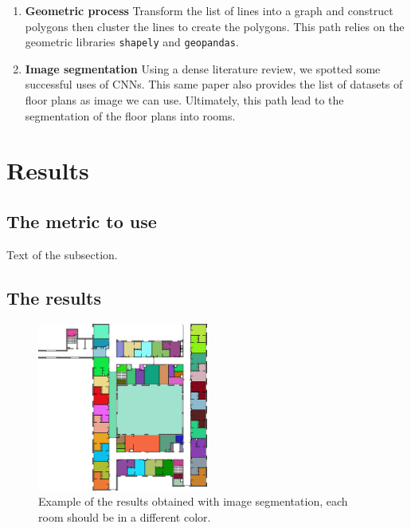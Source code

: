 \documentclass[11pt]{article}
\begin{document}
\begin{enumerate}
    \item \textbf{Geometric process} Transform the list of lines into a graph and 
    construct polygons \cite{Schafer2011AutomaticGO} then cluster the lines to 
    create the polygons\cite{dominguez2012Semiautomaticdetection}. This path relies on the
    geometric libraries \texttt{shapely} and \texttt{geopandas}. 
    \item \textbf{Image segmentation} Using a dense literature review\cite{PIZARRO2022104348}, we 
    spotted some successful uses of CNNs\cite{ijgi10020097}. This same paper also provides the list
    of datasets of floor plans as image we can use. Ultimately, this path lead
    to the segmentation of the floor plans into rooms.
\end{enumerate}

\section{Results}

\subsection{The metric to use}
Text of the subsection.

\subsection{The results}
\begin{figure}[h]
    \centering
    \includegraphics[width=0.5\textwidth]{figures/Output6_contours_image.png}

    \caption{Example of the results obtained with image segmentation, each room 
    should be in a different color.}
    \label{fig:result_segmentation}
\end{figure}
\end{document}
